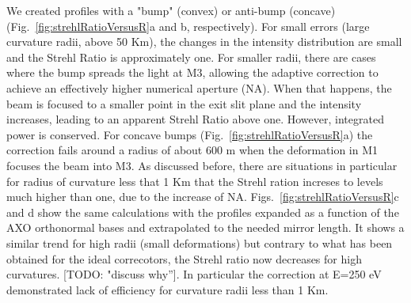 \documentclass{iucr}              %
\newcommand{\todo}[1]{{\color{red}[TODO: "#1'']}}
\begin{document}
We created profiles with a "bump" (convex) or anti-bump (concave) (Fig.~\ref{fig:strehlRatioVersusR}a and b, respectively).
For small errors (large curvature radii, above 50 Km), the changes in the intensity distribution are small and the Strehl Ratio is approximately one. For smaller radii, there are cases where the bump spreads the light at M3, allowing the adaptive correction to achieve an effectively higher numerical aperture (NA). When that happens, the beam is focused to a smaller point in the exit slit plane and the intensity increases, leading to an apparent Strehl Ratio above one. However, integrated power is conserved. For concave bumps (Fig.~\ref{fig:strehlRatioVersusR}a) the correction fails around a radius of about 600 m when the deformation in M1 focuses the beam into M3. As discussed before, there are situations in particular for radius of curvature less that 1 Km that the Strehl ration increses to levels much higher than one, due to the increase of NA. Figs.~\ref{fig:strehlRatioVersusR}c and d show the same calculations with the profiles expanded as a function of the AXO orthonormal bases and extrapolated to the needed mirror length. It shows a similar trend for high radii (small deformations) but contrary to what has been obtained for the ideal correcotors, the Strehl ratio now decreases for high curvatures. \todo{discuss why}. In particular the correction at E=250 eV demonstrated lack of efficiency for curvature radii less than 1 Km. 
\end{document}
